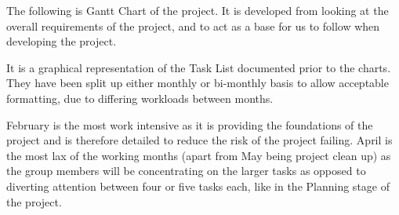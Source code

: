 The following is Gantt Chart of the project. It is developed from looking at 
the overall requirements of the project, and to act as a base for us to follow 
when developing the project.

It is a graphical representation of the Task List documented prior to the 
charts.  They have been split up either monthly or bi-monthly basis to allow 
acceptable formatting, due to differing workloads between months.

February is the most work intensive as it is providing the foundations of the
project and is therefore detailed to reduce the risk of the project failing.
April is the most lax of the working months (apart from May being project
clean up) as the group members will be concentrating on the larger tasks as
opposed to diverting attention between four or five tasks each, like in the
Planning stage of the project.
\pagebreak

